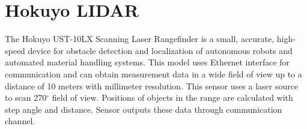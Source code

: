 \documentclass[times, utf8, diplomski, english]{fer}
\begin{document}
\section{Hokuyo LIDAR}
The Hokuyo UST-10LX Scanning Laser Rangefinder is a small, accurate, high-speed device for obstacle detection and localization of autonomous robots and automated material handling systems. 
This model uses Ethernet interface for communication and can obtain measurement data in a wide field of view up to a distance of 10 meters with millimeter resolution.
This sensor uses a laser source to scan 270$^\circ$ field of view. Positions of objects in the range are calculated with step angle and distance. Sensor outputs these data through communication channel.
\end{document}
